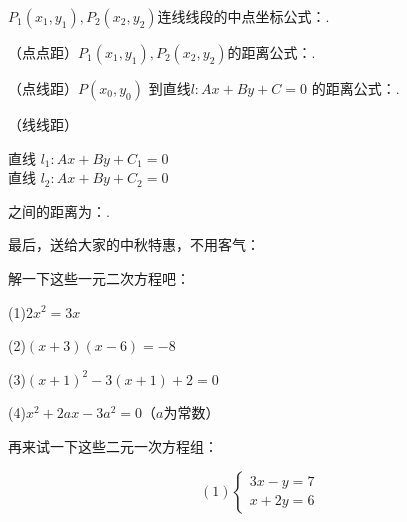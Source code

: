 \documentclass{book}
\begin{document}
      \begin{Exercise}

        \Question $P_1(x_1,y_1), P_2(x_2,y_2)$连线线段的中点坐标公式：\underline{\hspace{52pt}}.

        \Question （点点距）$P_1(x_1,y_1), P_2(x_2,y_2)$的距离公式：\underline{\hspace{102pt}}.

        \Question （点线距）$P(x_0,y_0)$ 到直线$l:Ax+By+C=0$ 的距离公式：\underline{\hspace{102pt}}.

        \Question （线线距）
        \begin{minipage}{0.4\textwidth}
          直线 $l_1:Ax+By+C_1=0$ \\
          直线 $l_2:Ax+By+C_2=0$
        \end{minipage}
        \begin{minipage}{0.6\textwidth}
          之间的距离为：\underline{\hspace{102pt}}.
        \end{minipage}

        \vspace{2cm}
        最后，送给大家的中秋特惠，不用客气：
        \begin{Exercise}

          \begin{minipage}{0.5\textwidth}
            解一下这些一元二次方程吧：

            (1)$2x^2=3x$ \vspace{2cm}

            (2)$(x+3)(x-6)=-8$ \vspace{2cm}

            (3)$(x+1)^2-3(x+1)+2=0$ \vspace{2cm}

            (4)$x^2+2ax-3a^2=0$（$a$为常数）
          \end{minipage}
          \begin{minipage}{0.5\textwidth}
            再来试一下这些二元一次方程组：

            \begin{displaymath}
                (1)\left\{ \begin{array}{ll}
                3x-y=7\\
                x+2y=6
                \end{array} \right.
            \end{displaymath}\vspace{4.5cm}


\end{minipage}
\end{Exercise}
\end{Exercise}
\end{document}
